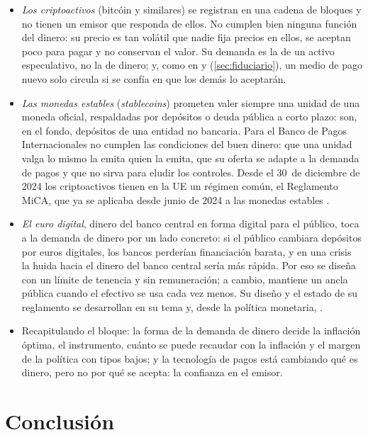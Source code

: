 \documentclass[11pt]{article}
\begin{document}
\begin{itemize}
\item \emph{Los criptoactivos} (bitcóin y similares) se registran en una cadena de bloques y no tienen un emisor que responda de ellos. No cumplen bien ninguna función del dinero: su precio es tan volátil que nadie fija precios en ellos, se aceptan poco para pagar y no conservan el valor. Su demanda es la de un activo especulativo, no la de dinero; y, como en  y  (\ref{sec:fiduciario}), un medio de pago nuevo solo circula si se confía en que los demás lo aceptarán.
\item \emph{Las monedas estables} (\emph{stablecoins}) prometen valer siempre una unidad de una moneda oficial, respaldadas por depósitos o deuda pública a corto plazo: son, en el fondo, depósitos de una entidad no bancaria. Para el Banco de Pagos Internacionales no cumplen las condiciones del buen dinero: que una unidad valga lo mismo la emita quien la emita, que su oferta se adapte a la demanda de pagos y que no sirva para eludir los controles\nocite{BIS2025Annual}. Desde el 30~de diciembre de 2024 los criptoactivos tienen en la UE un régimen común, el Reglamento MiCA, que ya se aplicaba desde junio de 2024 a las monedas estables\nocite{UE2023MiCA} .
\item \emph{El euro digital}, dinero del banco central en forma digital para el público, toca a la demanda de dinero por un lado concreto: si el público cambiara depósitos por euros digitales, los bancos perderían financiación barata, y en una crisis la huida hacia el dinero del banco central sería más rápida. Por eso se diseña con un límite de tenencia y sin remuneración; a cambio, mantiene un ancla pública cuando el efectivo se usa cada vez menos. Su diseño y el estado de su reglamento se desarrollan en su tema  y, desde la política monetaria, .
\item Recapitulando el bloque: la forma de la demanda de dinero decide la inflación óptima, el instrumento, cuánto se puede recaudar con la inflación y el margen de la política con tipos bajos; y la tecnología de pagos está cambiando qué es dinero, pero no por qué se acepta: la confianza en el emisor.
\end{itemize}

\section*{Conclusión}
\end{document}
